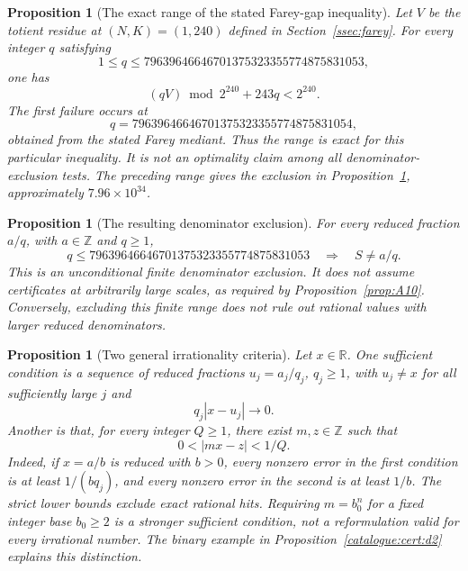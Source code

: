 \documentclass[11pt]{article}
\theoremstyle{plain}
\newtheorem{prop}[thm]{Proposition}
\theoremstyle{definition}
\theoremstyle{remark}
\begin{document}
\begin{prop}[The exact range of the stated Farey-gap inequality]\label{prop:C2-inv}
Let $V$ be the totient residue at $(N,K)=(1,240)$ defined in
Section~\ref{ssec:farey}. For every integer $q$ satisfying
\[
 1\le q\le79639646646701375323355774875831053,
\]
one has
\[
 (qV)\bmod2^{240}+243q<2^{240}.
\]
The first failure occurs at
\[
 q=79639646646701375323355774875831054,
\]
obtained from the stated Farey mediant. Thus the range is exact for
this particular inequality.
It is not an optimality claim among all denominator-exclusion tests.
The preceding range gives the exclusion in
Proposition~\ref{prop:C3-inv}, approximately $7.96\times10^{34}$.
\end{prop}

\begin{prop}[The resulting denominator exclusion]\label{prop:C3-inv}
For every reduced fraction $a/q$, with $a\in\mathbb Z$ and $q\ge1$,
\[
 q\le79639646646701375323355774875831053
 \quad\Longrightarrow\quad S\ne a/q.
\]
This is an unconditional finite denominator exclusion. It does not
assume certificates at arbitrarily large scales, as required by
Proposition~\ref{prop:A10}. Conversely, excluding this finite range
does not rule out rational values with larger reduced denominators.
\end{prop}

\begin{prop}[Two general irrationality criteria]\label{prop:D1D2-inv}
Let $x\in\mathbb R$. One sufficient condition is a sequence of
reduced fractions $u_j=a_j/q_j$, $q_j\ge1$, with $u_j\ne x$ for
all sufficiently large $j$ and
\[
 q_j|x-u_j|\longrightarrow0.
\]
Another is that, for every integer $Q\ge1$, there exist $m,z\in\mathbb Z$
such that
\[
 0<|mx-z|<1/Q.
\]
Indeed, if $x=a/b$ is reduced with $b>0$, every nonzero error in the
first condition is at least $1/(bq_j)$, and every nonzero error in the
second is at least $1/b$. The strict lower bounds exclude exact
rational hits. Requiring $m=b_0^n$ for a fixed integer base $b_0\ge2$
is a stronger sufficient condition, not a reformulation valid for
every irrational number. The binary example in
Proposition~\ref{catalogue:cert:d2} explains this distinction.
\end{prop}
\end{document}
